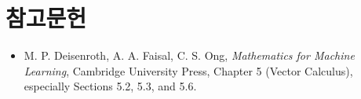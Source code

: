 \documentclass[11pt,a4paper]{article}
\begin{document}
\section*{참고문헌}
\begin{itemize}
\item M. P. Deisenroth, A. A. Faisal, C. S. Ong, \emph{Mathematics for Machine Learning}, Cambridge University Press, Chapter 5 (Vector Calculus), especially Sections 5.2, 5.3, and 5.6.
\end{itemize}
\end{document}
